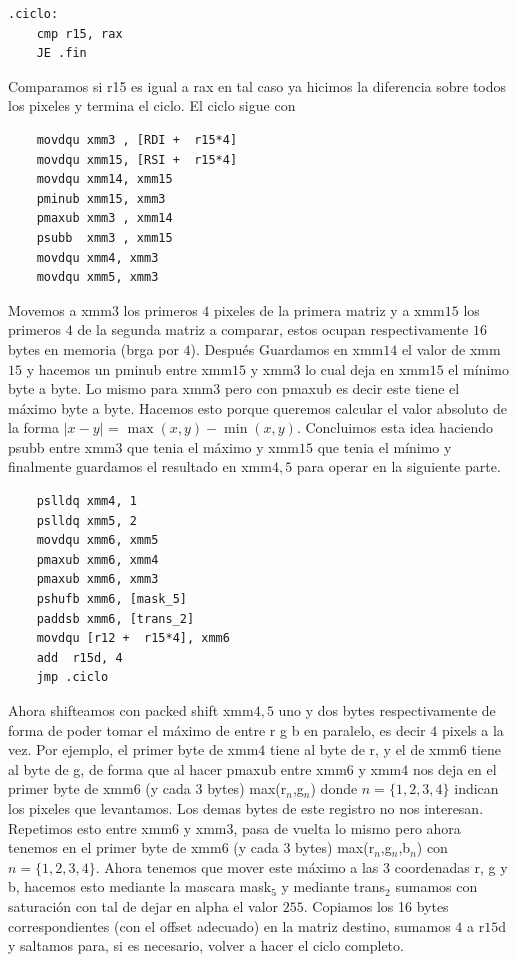 \documentclass[a4paper]{article}
\begin{document}
\begin{codesnippet}
\begin{verbatim}
.ciclo:
    cmp r15, rax
    JE .fin
\end{verbatim}
\end{codesnippet}

\noindent Comparamos si r15 es igual a rax en tal caso ya hicimos la diferencia sobre todos los pixeles y termina el ciclo. El ciclo sigue con

\begin{codesnippet}
\begin{verbatim}
    movdqu xmm3 , [RDI +  r15*4]   
    movdqu xmm15, [RSI +  r15*4]
    movdqu xmm14, xmm15     
    pminub xmm15, xmm3        
    pmaxub xmm3 , xmm14        
    psubb  xmm3 , xmm15             
    movdqu xmm4, xmm3 
    movdqu xmm5, xmm3       
\end{verbatim}
\end{codesnippet}

\noindent Movemos a xmm$3$ los primeros $4$ pixeles de la primera matriz y a xmm$15$ los primeros $4$ de la segunda matriz a comparar, estos ocupan respectivamente $16$ bytes en memoria (brga por $4$). Después Guardamos en xmm$14$ el valor de xmm$15$ y hacemos un pminub entre xmm$15$ y xmm$3$ lo cual deja en xmm$15$ el mínimo byte a byte. Lo mismo para xmm$3$ pero con pmaxub es decir este tiene el máximo byte a byte. Hacemos esto porque queremos calcular el valor absoluto de la forma $|x-y|$ = $\max(x,y) - \min(x,y)$. Concluimos esta idea haciendo psubb entre xmm$3$ que tenia el máximo y xmm$15$ que tenia el mínimo y finalmente guardamos el resultado en xmm$4,5$ para operar en la siguiente parte.

\begin{codesnippet}
\begin{verbatim}
    pslldq xmm4, 1                  
    pslldq xmm5, 2               
    movdqu xmm6, xmm5             
    pmaxub xmm6, xmm4             
    pmaxub xmm6, xmm3              
    pshufb xmm6, [mask_5] 
    paddsb xmm6, [trans_2]
    movdqu [r12 +  r15*4], xmm6
    add  r15d, 4
    jmp .ciclo
\end{verbatim}
\end{codesnippet}
\noindent Ahora shifteamos con packed shift xmm$4,5$ uno y dos bytes respectivamente de forma de poder tomar el máximo de entre r g b en paralelo, es decir $4$ pixels a la vez. Por ejemplo, el primer byte de xmm$4$ tiene al byte de r, y el de xmm$6$ tiene al byte de g, de forma que al hacer pmaxub entre  xmm$6$ y xmm$4$ nos deja en el primer byte de xmm$6$ (y cada 3 bytes) max(r$_n$,g$_n$) donde $n = \{1,2,3,4 \}$ indican los pixeles que levantamos. Los demas bytes de este registro no nos interesan. Repetimos esto entre xmm$6$ y xmm$3$, pasa de vuelta lo mismo pero ahora tenemos en el primer byte de xmm$6$ (y cada $3$ bytes) max(r$_n$,g$_n$,b$_n$) con $n = \{1,2,3,4 \}$. Ahora tenemos que mover este máximo a las 3 coordenadas r, g y b, hacemos esto mediante la mascara mask$_5$ y mediante trans$_2$ sumamos con saturación con tal de dejar en alpha el valor $255$. Copiamos los 16 bytes correspondientes (con el offset adecuado) en la matriz destino, sumamos $4$ a r$15$d y saltamos para, si es necesario, volver a hacer el ciclo completo.
\end{document}

